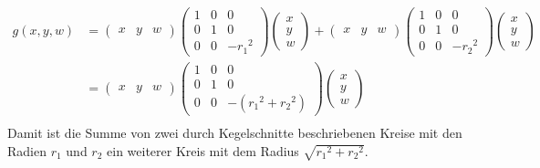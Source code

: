 \begin{align*}
  g(x, y, w) &= \left(\begin{matrix}x &y& w\end{matrix}\right)\left(\begin{matrix}1&0&0\\0&1&0\\0&0&-{r_1}^2\end{matrix}\right)\left(\begin{matrix}x\\y\\w\end{matrix}\right) +
  \left(\begin{matrix}x &y& w\end{matrix}\right)\left(\begin{matrix}1&0&0\\0&1&0\\0&0&-{r_2}^2\end{matrix}\right)\left(\begin{matrix}x\\y\\w\end{matrix}\right)\\
             &= \left(\begin{matrix}x &y& w\end{matrix}\right)\left(\begin{matrix}1&0&0\\0&1&0\\0&0&-({r_1}^2+{r_2}^2)\end{matrix}\right)\left(\begin{matrix}x\\y\\w\end{matrix}\right)\\
\end{align*}
Damit ist die Summe von zwei durch Kegelschnitte beschriebenen Kreise mit den Radien $r_1$ und $r_2$ ein weiterer Kreis mit dem Radius $\sqrt{{r_1}^2+{r_2}^2}$.
